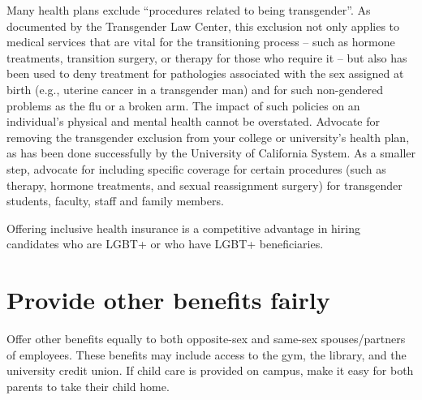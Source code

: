 Many health plans exclude ``procedures related to being transgender''. As documented by the Transgender Law Center, this exclusion not only applies to medical services that are vital for the transitioning process -- such as hormone treatments, transition surgery, or therapy for those who require it -- but also has been used to deny treatment for pathologies associated with the sex assigned at birth (e.g., uterine cancer in a transgender man) and for such non-gendered problems as the flu or a broken arm. The impact of such policies on an individual's physical and mental health cannot be overstated. Advocate for removing the transgender exclusion from your college or university's health plan, as has been done successfully by the University of California System.  As a smaller step, advocate for including specific coverage for certain procedures (such as therapy, hormone treatments, and sexual reassignment surgery) for transgender students, faculty, staff and family members.

Offering inclusive health insurance is a competitive advantage in hiring candidates who are LGBT+ or who have LGBT+ beneficiaries.



\section {Provide other benefits fairly}
\label{other-benefits}
Offer other benefits equally to both opposite-sex and same-sex spouses/partners of employees.  These benefits may include access to the gym, the library, and the university credit union.  If child care is provided on campus, make it easy for both parents to take their child home.  

